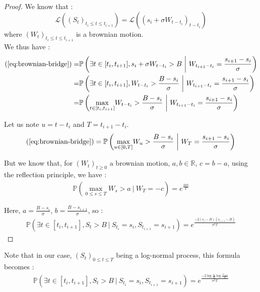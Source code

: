 \documentclass[a4paper,11pt,english]{book}
\begin{document}
\begin{proof}
We know that :
$$\mathcal{L}((S_t)_{t_i \leq t \leq t_{i+1}})=\mathcal{L}((s_i+\sigma W_{t-t_i})_{t-t_i})$$
where $(W_t)_{t_i \leq t \leq t_{i+1}}$ is a brownian motion.\\

We thus have :
$$\begin{aligned}
(\ref{eq:brownian-bridge}) = & \mathbb{P}\left(\exists t \in [t_i,t_{i+1}],s_i+\sigma W_{t-t_i}>B~\bigg\vert~W_{t_{i+1}-t_i}=\frac{s_{i+1}-s_i}{\sigma}\right) \\
= & \mathbb{P}\left(\exists t \in [t_i,t_{i+1}],W_{t-t_i}>\frac{B-s_i}{\sigma}~\bigg\vert~W_{t_{i+1}-t_i}=\frac{s_{i+1}-s_i}{\sigma}\right)\\
= & \mathbb{P}\left(\underset{t \in [t_i,t_{i+1}]}{\max} W_{t-t_i}>\frac{B-s_i}{\sigma}~\bigg\vert~W_{t_{i+1}-t_i}=\frac{s_{i+1}-s_i}{\sigma}\right)
\end{aligned}$$

Let us note $u=t-t_i$ and $T=t_{i+1}-t_{i}$.
$$\begin{aligned}
(\ref{eq:brownian-bridge}) = \mathbb{P}\left(\underset{u \in [0,T]}{\max} W_{u}>\frac{B-s_i}{\sigma}~\bigg\vert~W_{T}=\frac{s_{i+1}-s_i}{\sigma}\right)
\end{aligned}$$

But we know that, for $(W_t)_{t \geq 0}$ a brownian motion, $a,b \in \mathbb{R}$, $c=b-a$, using the reflection principle, we have :
$$\begin{aligned}
\mathbb{P}\left(\underset{0 \leq s \leq T}{\max} W_{s}>a~\bigg\vert~W_{T}=-c\right) = e^{\frac{2ab}{T}}
\end{aligned}$$

Here, $a=\frac{B-s_i}{\sigma}$, $b=\frac{B-s_{i+1}}{\sigma}$, so :
$$\begin{aligned}
\mathbb{P}(\exists t \in [t_i,t_{i+1}],S_t>B~|~S_{t_i}=s_i,S_{t_{i+1}}=s_{i+1}) = e^{\frac{-2(s_i-B)(s_{i+1}-B)}{\sigma^2 T}}
\end{aligned}$$
\end{proof}

Note that in our case, $(S_t)_{0 \leq t \leq T}$ being a log-normal process, this formula becomes :
$$\begin{aligned}
\mathbb{P}(\exists t \in [t_i,t_{i+1}],S_t>B~|~S_{t_i}=s_i,S_{t_{i+1}}=s_{i+1}) = e^{\frac{-2\log{\frac{s_i}{B}}\log{\frac{s_{i+1}}{B}}}{\sigma^2 T}}
\end{aligned}$$

\endgroup
\end{document}
